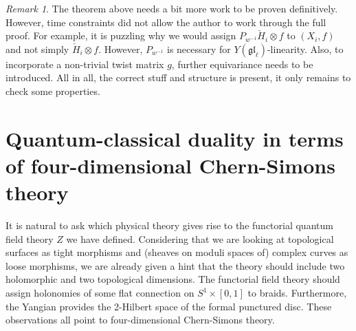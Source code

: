 \documentclass[11pt]{report}
\newtheorem{lemma}[theorem]{Lemma}
\theoremstyle{definition}
\theoremstyle{remark}
\newtheorem*{remark}{Remark}
\theoremstyle{remark}
\begin{document}
\begin{remark}
The theorem above needs a bit more work to be proven definitively. However, time constraints did not allow the author to work through the full proof. For example, it is puzzling why we would assign $P_{w^{-1}} \check H_i \otimes f$ to $(X_i,f)$ and not simply $\check H_i \otimes f$. However, $P_{w^{-1}}$ is necessary for $Y(\mathfrak{gl}_\ell)$-linearity. Also, to incorporate a non-trivial twist matrix $g$, further equivariance needs to be introduced. All in all, the correct stuff and structure is present, it only remains to check some properties.
\end{remark}

%

\section{Quantum-classical duality in terms of four-dimensional Chern-Simons theory}

It is natural to ask which physical theory gives rise to the functorial quantum field theory $Z$ we have defined. Considering that we are looking at topological surfaces as tight morphisms and (sheaves on moduli spaces of) complex curves as loose morphisms, we are already given a hint that the theory should include two holomorphic and two topological dimensions. The functorial field theory should assign holonomies of some flat connection on $S^1 \times [0,1]$ to braids. Furthermore, the Yangian provides the 2-Hilbert space of the formal punctured disc. These observations all point to four-dimensional Chern-Simons theory.
\end{document}
